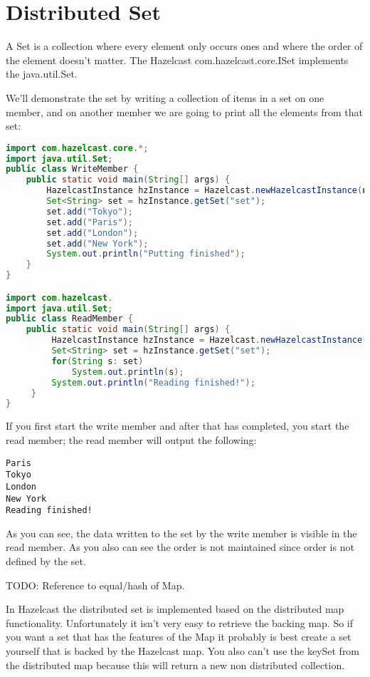 \section{Distributed Set}
A Set is a collection where every element only occurs ones and where the order of the element doesn't matter. The Hazelcast com.hazelcast.core.ISet implements the java.util.Set.

We'll demonstrate the set by writing a collection of items in a set on one member, and on another member we are going to print all the elements from that set:
\begin{lstlisting}[language=java]
import com.hazelcast.core.*;
import java.util.Set;
public class WriteMember {
    public static void main(String[] args) {
        HazelcastInstance hzInstance = Hazelcast.newHazelcastInstance(null);
        Set<String> set = hzInstance.getSet("set");
        set.add("Tokyo");
        set.add("Paris");
        set.add("London");
        set.add("New York");
        System.out.println("Putting finished");
    }
}

import com.hazelcast.
import java.util.Set;
public class ReadMember {
    public static void main(String[] args) {
         HazelcastInstance hzInstance = Hazelcast.newHazelcastInstance(null);
         Set<String> set = hzInstance.getSet("set");
         for(String s: set)
             System.out.println(s);
         System.out.println("Reading finished!");
     }
}

\end{lstlisting}

If you first start the write member and after that has completed, you start the read member; the read member will output the following:
\begin{verbatim}
Paris
Tokyo
London
New York
Reading finished!	
\end{verbatim}
As you can see, the data written to the set by the write member is visible in the read member. As you also can see the order is not maintained since order is not defined by the set.

TODO: Reference to equal/hash of Map.

In Hazelcast the distributed set is implemented based on the distributed map functionality. Unfortunately it isn't very easy to retrieve the backing map. So if you want a set that has the features of the Map it probably is best create a set yourself that is backed by the Hazelcast map. You also can't use the keySet from the distributed map because this will return a new non distributed collection. 

